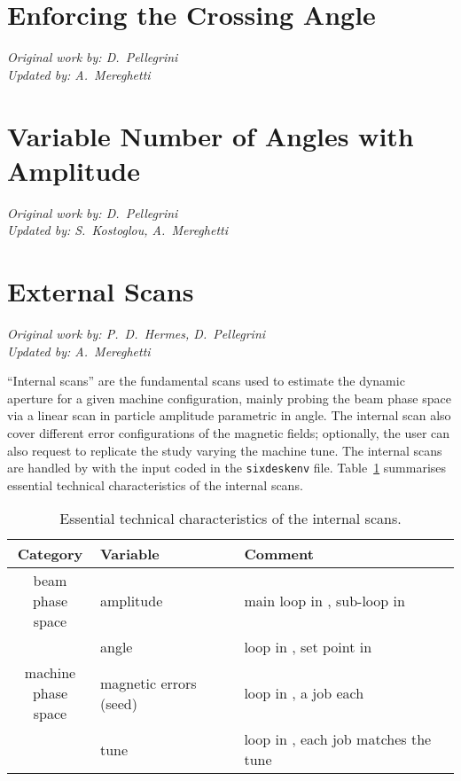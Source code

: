 \section{Enforcing the Crossing Angle} \label{EnforceXingAngle}
\begin{flushright}
\emph{Original work by: D.~Pellegrini} \\
\emph{Updated by: A.~Mereghetti}
\end{flushright}

\section{Variable Number of Angles with Amplitude} \label{varAnglesWithAmpli}
\begin{flushright}
\emph{Original work by: D.~Pellegrini} \\
\emph{Updated by: S.~Kostoglou, A.~Mereghetti}
\end{flushright}

\section{External Scans} \label{ExternalScans}
\begin{flushright}
\emph{Original work by: P.~D.~Hermes, D.~Pellegrini} \\
\emph{Updated by: A.~Mereghetti}
\end{flushright}
``Internal scans'' are the fundamental scans used to estimate the dynamic
aperture for a given machine configuration, mainly probing the beam phase
space via a linear scan in particle amplitude parametric in angle.
The internal scan also cover different error
configurations of the magnetic fields; optionally, the user can also request
to replicate the study varying the machine tune.
The internal scans are handled by \SIXDESK{} with the input coded
in the \texttt{sixdeskenv} file.
Table~\ref{tab:InternalScanParamters} summarises essential technical
characteristics of the internal scans.
\begin{table}[t]
\begin{center}
    \caption{Essential technical
      characteristics of the internal scans.}
    \label{tab:InternalScanParamters}
    \begin{tabular}{|c|l|l|}
    \hline
    \rowcolor{blue!30}
    \textbf{Category} & \textbf{Variable} & \textbf{Comment} \\
    \hline
    \multirowcell{2}{beam \\ phase space}
    & amplitude & main loop in \SIXDESK{}, sub-loop in \SIXTRACK{} \\
    \cline{2-3}
    & angle     & loop in \SIXDESK{}, set point in \SIXTRACK{} \\
    \hline
    \multirowcell{2}{machine \\ phase space}
    & magnetic errors (seed) & loop in \SIXDESK{}, a \MADX{} job each\\
    \cline{2-3}
    & tune & loop in \SIXDESK{}, each \SIXTRACK{} job matches the tune \\
    \hline
    \end{tabular}
\end{center}
\end{table}

